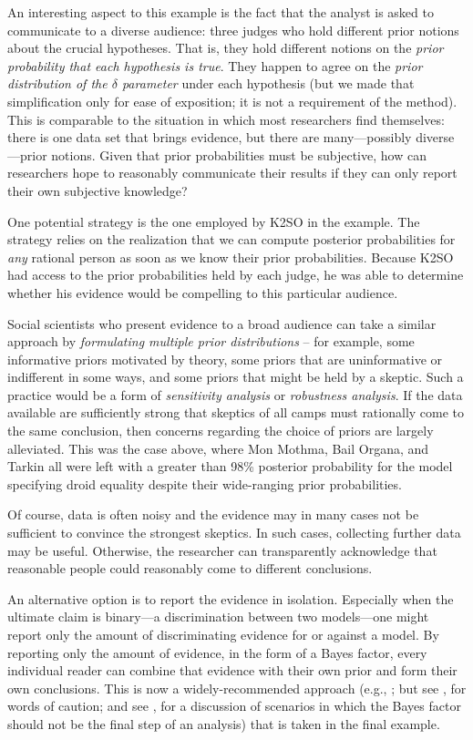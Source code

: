 An interesting aspect to this example is the fact that the analyst is asked to communicate to a diverse audience: three judges who hold different prior notions about the crucial hypotheses. That is, they hold different notions on the \emph{prior probability that each hypothesis is true}. They happen to agree on the \emph{prior distribution of the $\delta$ parameter} under each hypothesis (but we made that simplification only for ease of exposition; it is not a requirement of the method).  This is comparable to the situation in which most researchers find themselves: there is one data set that brings evidence, but there are many---possibly diverse---prior notions. Given that prior probabilities must be subjective, how can researchers hope to reasonably communicate their results if they can only report their own subjective knowledge?

One potential strategy is the one employed by K2SO in the example.  The strategy relies on the realization that we can compute posterior probabilities for \emph{any} rational person as soon as we know their prior probabilities.  Because K2SO had access to the prior probabilities held by each judge, he was able to determine whether his evidence would be compelling to this particular audience.

Social scientists who present evidence to a broad audience can take a similar approach by \emph{formulating multiple prior distributions} -- for example, some informative priors motivated by theory, some priors that are uninformative or indifferent in some ways, and some priors that might be held by a skeptic. Such a practice would be a form of \emph{sensitivity analysis} or \emph{robustness analysis}.  If the data available are sufficiently strong that skeptics of all camps must rationally come to the same conclusion, then concerns regarding the choice of priors are largely alleviated. This was the case above, where Mon Mothma, Bail Organa, and Tarkin all were left with a greater than 98\% posterior probability for the model specifying droid equality despite their wide-ranging prior probabilities.

Of course, data is often noisy and the evidence may in many cases not be sufficient to convince the strongest skeptics. In such cases, collecting further data may be useful. Otherwise, the researcher can transparently acknowledge that reasonable people could reasonably come to different conclusions. 

An alternative option is to report the evidence in isolation.  Especially when the ultimate claim is binary---a discrimination between two models---one might report only the amount of discriminating evidence for or against a model. By reporting only the amount of evidence, in the form of a Bayes factor, every individual reader can combine that evidence with their own prior and form their own conclusions. This is now a widely-recommended approach (e.g., ; but see , for words of caution{; and see , for a discussion of scenarios in which the Bayes factor should not be the final step of an analysis}) that is taken in the final example.

